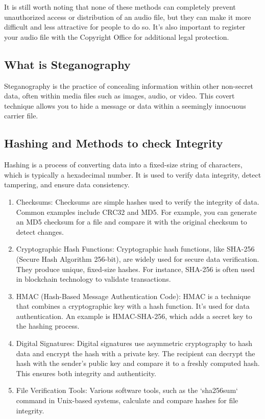 \documentclass[11pt]{article}
\begin{document}
It is still worth noting that none of these methods can completely prevent unauthorized access or distribution of an audio file, but they can make it more difficult and less attractive for people to do so. It's also important to register your audio file with the Copyright Office for additional legal protection.

\subsection{What is Steganography}
Steganography is the practice of concealing information within other non-secret data, often within media files such as images, audio, or video. This covert technique allows you to hide a message or data within a seemingly innocuous carrier file.

\subsection{Hashing and Methods to check Integrity}
Hashing is a process of converting data into a fixed-size string of characters, which is typically a hexadecimal number. It is used to verify data integrity, detect tampering, and ensure data consistency.

\begin{enumerate}
    \item Checksums: Checksums are simple hashes used to verify the integrity of data. Common examples include CRC32 and MD5. For example, you can generate an MD5 checksum for a file and compare it with the original checksum to detect changes.

    \item Cryptographic Hash Functions: Cryptographic hash functions, like SHA-256 (Secure Hash Algorithm 256-bit), are widely used for secure data verification. They produce unique, fixed-size hashes. For instance, SHA-256 is often used in blockchain technology to validate transactions.

    \item HMAC (Hash-Based Message Authentication Code): HMAC is a technique that combines a cryptographic key with a hash function. It's used for data authentication. An example is HMAC-SHA-256, which adds a secret key to the hashing process.

    \item Digital Signatures: Digital signatures use asymmetric cryptography to hash data and encrypt the hash with a private key. The recipient can decrypt the hash with the sender's public key and compare it to a freshly computed hash. This ensures both integrity and authenticity.

    \item File Verification Tools: Various software tools, such as the `sha256sum` command in Unix-based systems, calculate and compare hashes for file integrity.

\end{enumerate}
\end{document}
